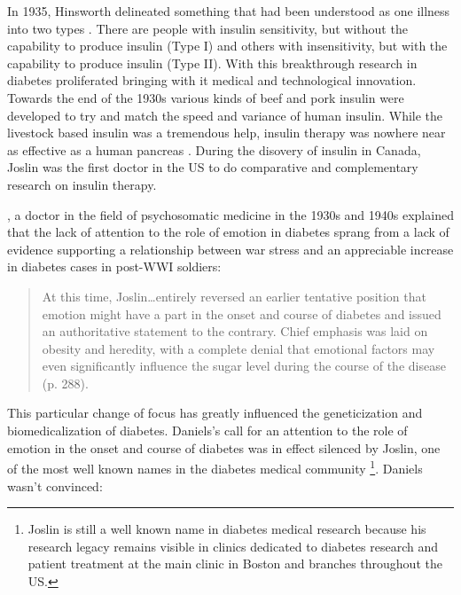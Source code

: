 \documentclass[12pt]{article}
\begin{document}
In 1935, Hinsworth delineated something that had been understood as one illness into two types \citep{sattley_history_1996}. There are people with insulin sensitivity, but without the capability to produce insulin (Type I) and others with insensitivity, but with the capability to produce insulin (Type II).  With this breakthrough research in diabetes proliferated bringing with it medical and technological innovation. Towards the end of the 1930s various kinds of beef and pork insulin were developed to try and match the speed and variance of human insulin. While the livestock based insulin was a tremendous help, insulin therapy was nowhere near as effective as a human pancreas \citep{sattley_history_1996}. During the disovery of insulin in Canada, Joslin was the first doctor in the US to do comparative and complementary research on insulin therapy.

\citet{daniels_role_1948}, a doctor in the field of psychosomatic medicine in the 1930s and 1940s explained that the lack of attention to the role of emotion in diabetes sprang from a lack of evidence supporting a relationship between war stress and an appreciable increase in diabetes cases in post-WWI soldiers:

\begin{singlespace}
  \begin{quote}
  At this time, Joslin\dots entirely reversed an earlier tentative position that emotion might have a part in the onset and course of diabetes and issued an authoritative statement to the contrary. Chief emphasis was laid on obesity and heredity, with a complete denial that emotional factors may even significantly influence the sugar level during the course of the disease (p. 288).
  \end{quote} 
\end{singlespace} 

This particular change of focus has greatly influenced the geneticization and biomedicalization of diabetes. Daniels's call for an attention to the role of emotion in the onset and course of diabetes was in effect silenced by Joslin, one of the most well known names in the diabetes medical community \footnote{Joslin is still a well known name in diabetes medical research because his research legacy remains visible in clinics dedicated to diabetes research and patient treatment at the main clinic in Boston and branches throughout the US.}. Daniels wasn't convinced: 
\end{document}
